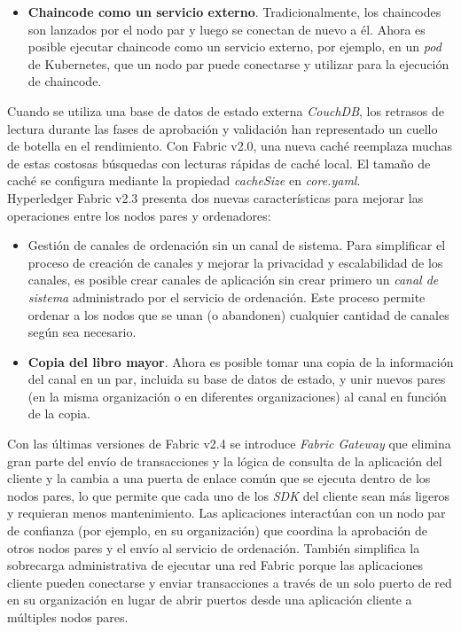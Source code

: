 {\begin{itemize}
\item {\bf Chaincode como un servicio externo}. Tradicionalmente, los chaincodes son lanzados por el nodo par y luego se conectan de nuevo a \'el. Ahora es posible ejecutar chaincode como un servicio externo, por ejemplo, en un \emph{pod} de Kubernetes, que un nodo par puede conectarse y utilizar para la ejecuci\'on de chaincode.
\end{itemize}

Cuando se utiliza una base de datos de estado externa \emph{CouchDB}, los retrasos de lectura durante las fases de aprobaci\'on y validaci\'on han representado un cuello de botella en el rendimiento. Con Fabric v2.0, una nueva cach\'e reemplaza muchas de estas costosas b\'usquedas con lecturas r\'apidas de cach\'e local. El tama\~no de cach\'e se configura mediante la propiedad \emph{cacheSize} en \emph{core.yaml}.\\

Hyperledger Fabric v2.3 presenta dos nuevas caracter\'isticas para mejorar las operaciones entre los nodos pares y ordenadores:

\begin{itemize}
\item {Gesti\'on de canales de ordenaci\'on sin un canal de sistema}. Para simplificar el proceso de creaci\'on de canales y mejorar la privacidad y escalabilidad de los canales, es posible crear canales de aplicaci\'on sin crear primero un \emph{canal de sistema} administrado por el servicio de ordenaci\'on. Este proceso permite ordenar a los nodos que se unan (o abandonen) cualquier cantidad de canales seg\'un sea necesario.

\item{\bf Copia del libro mayor}. Ahora es posible tomar una copia de la informaci\'on del canal en un par, incluida su base de datos de estado, y unir nuevos pares (en la misma organizaci\'on o en diferentes organizaciones) al canal en funci\'on de la copia.
\end{itemize}

Con las \'ultimas versiones de Fabric v2.4 se introduce \emph{Fabric Gateway} que elimina gran parte del env\'io de transacciones y la l\'ogica de consulta de la aplicaci\'on del cliente y la cambia a una puerta de enlace com\'un que se ejecuta dentro de los nodos pares, lo que permite que cada uno de los \emph{SDK} del cliente sean m\'as ligeros y requieran menos mantenimiento. Las aplicaciones interact\'uan con un nodo par de confianza (por ejemplo, en su organizaci\'on) que coordina la aprobaci\'on de otros nodos pares y el env\'io al servicio de ordenaci\'on. Tambi\'en simplifica la sobrecarga administrativa de ejecutar una red Fabric porque las aplicaciones cliente pueden conectarse y enviar transacciones a trav\'es de un solo puerto de red en su organizaci\'on en lugar de abrir puertos desde una aplicaci\'on cliente a m\'ultiples nodos pares.

}
